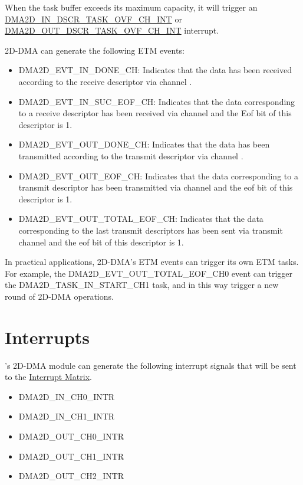 \documentclass[main\_\_EN.tex]{subfiles}
\begin{document}
\begin{itemize}
\begin{tiplisting}
        When the task buffer exceeds its maximum capacity, it will trigger an \hyperref[int:DMA2DINDSCRTASKOVFINT]{DMA2D\_IN\_DSCR\_TASK\_OVF\_CH\_INT} or \hyperref[int:DMA2DOUTDSCRTASKOVFINT]{DMA2D\_OUT\_DSCR\_TASK\_OVF\_CH\_INT} interrupt.
        \end{tiplisting}
\end{itemize}

2D-DMA can generate the following ETM events:

\begin{itemize}
    \item DMA2D\_EVT\_IN\_DONE\_CH: Indicates that the data has been received according to the receive descriptor via channel .
    \item DMA2D\_EVT\_IN\_SUC\_EOF\_CH: Indicates that the data corresponding to a receive descriptor has been received via channel  and the Eof bit of this descriptor is 1.
    \item DMA2D\_EVT\_OUT\_DONE\_CH: Indicates that the data has been transmitted according to the transmit descriptor via channel .
    \item DMA2D\_EVT\_OUT\_EOF\_CH: Indicates that the data corresponding to a transmit descriptor has been transmitted via channel  and the eof bit of this descriptor is 1.
    \item DMA2D\_EVT\_OUT\_TOTAL\_EOF\_CH: Indicates that the data corresponding to the last transmit descriptors has been sent via transmit channel  and the eof bit of this descriptor is 1.
\end{itemize}

In practical applications, 2D-DMA's ETM events can trigger its own ETM tasks. For example, the DMA2D\_EVT\_OUT\_TOTAL\_EOF\_CH0 event can trigger the DMA2D\_TASK\_IN\_START\_CH1 task, and in this way trigger a new round of 2D-DMA operations.



\section{Interrupts}

\chipname{}'s 2D-DMA module can generate the following interrupt signals that will be sent to the \hyperref[mod:intmtrx]{Interrupt Matrix}.

    \begin{itemize}
        \item DMA2D\_IN\_CH0\_INTR
        \item DMA2D\_IN\_CH1\_INTR
        \item DMA2D\_OUT\_CH0\_INTR
        \item DMA2D\_OUT\_CH1\_INTR
        \item DMA2D\_OUT\_CH2\_INTR
    \end{itemize}
\end{document}
